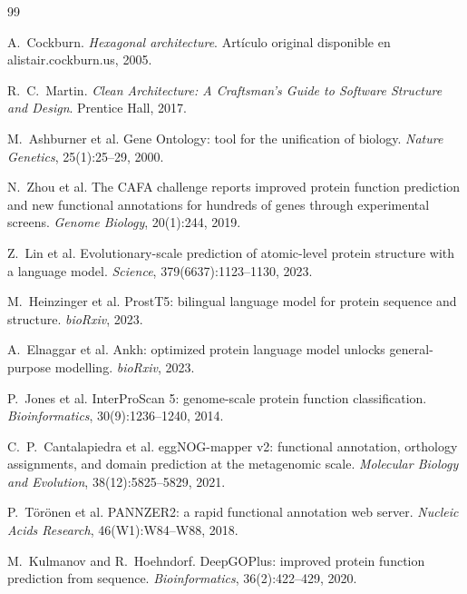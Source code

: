 \documentclass[11pt,a4paper]{article}
\begin{document}
\begin{thebibliography}{99}

A.~Cockburn.
\newblock \emph{Hexagonal architecture}.
\newblock Artículo original disponible en alistair.cockburn.us, 2005.

R.~C.~Martin.
\newblock \emph{Clean Architecture: A Craftsman's Guide to Software Structure
  and Design}.
\newblock Prentice Hall, 2017.

M.~Ashburner et al.
\newblock Gene Ontology: tool for the unification of biology.
\newblock \emph{Nature Genetics}, 25(1):25--29, 2000.

N.~Zhou et al.
\newblock The CAFA challenge reports improved protein function prediction and
  new functional annotations for hundreds of genes through experimental
  screens.
\newblock \emph{Genome Biology}, 20(1):244, 2019.

Z.~Lin et al.
\newblock Evolutionary-scale prediction of atomic-level protein structure with
  a language model.
\newblock \emph{Science}, 379(6637):1123--1130, 2023.

M.~Heinzinger et al.
\newblock ProstT5: bilingual language model for protein sequence and
  structure.
\newblock \emph{bioRxiv}, 2023.

A.~Elnaggar et al.
\newblock Ankh: optimized protein language model unlocks general-purpose
  modelling.
\newblock \emph{bioRxiv}, 2023.

P.~Jones et al.
\newblock InterProScan 5: genome-scale protein function classification.
\newblock \emph{Bioinformatics}, 30(9):1236--1240, 2014.

C.~P.~Cantalapiedra et al.
\newblock eggNOG-mapper v2: functional annotation, orthology assignments, and
  domain prediction at the metagenomic scale.
\newblock \emph{Molecular Biology and Evolution}, 38(12):5825--5829, 2021.

P.~Törönen et al.
\newblock PANNZER2: a rapid functional annotation web server.
\newblock \emph{Nucleic Acids Research}, 46(W1):W84--W88, 2018.

M.~Kulmanov and R.~Hoehndorf.
\newblock DeepGOPlus: improved protein function prediction from sequence.
\newblock \emph{Bioinformatics}, 36(2):422--429, 2020.

\end{thebibliography}
\end{document}
